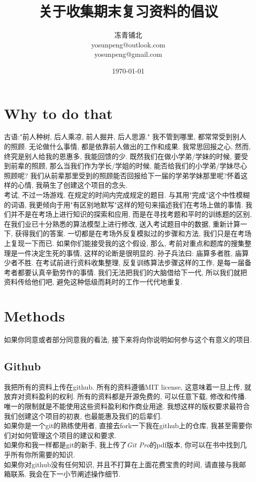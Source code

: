 \documentclass{article}
\title{关于收集期末复习资料的倡议}
\author{冻青铺北\\ yosunpeng@outlook.com \\ yosunpeng@gmail.com}
\date{ \today}
\begin{document}
\begin{spacing}{1.5}

\maketitle
\section{Why to do that}
古语:"前人种树, 后人乘凉, 前人掘井, 后人思源." 我不管到哪里, 都常常受到别人的照顾. 无论做什么事情, 都是依靠前人做出的工作和成果. 我常思回报之心, 然而, 终究是别人给我的恩惠多, 我能回馈的少. 既然我们在做小学弟/学妹的时候, 要受到前辈的照顾, 那么当我们作为学长/学姐的时候, 能否给我们的小学弟/学妹尽心照顾呢? 我们从前辈那里受到的照顾能否回报给下一届的学弟学妹那里呢?怀着这样的心情, 我萌生了创建这个项目的念头. \\
考试, 不过一场游戏. 在规定的时间内完成规定的题目. 与其用"完成"这个中性模糊的词语, 我更倾向于用"有区别地默写"这样的短句来描述我们在考场上做的事情. 我们并不是在考场上进行知识的探索和应用, 而是在寻找考题和平时的训练题的区别, 在我们业已十分熟悉的算法模型上进行修改, 送入考试题目中的数据, 重新计算一下, 获得我们的答案. 一切都是在考场外反复模拟过的步骤和方法, 我们只是在考场上复现一下而已. 如果你们能接受我的这个假设, 那么, 考前对重点和题库的搜集整理是一件决定生死的事情, 这样的论断是很明显的. 孙子兵法曰: 庙算多者胜, 庙算少者不胜. 在考试前进行资料收集整理, 反复训练算法步骤这样的工作, 是每一届备考者都要认真辛勤劳作的事情. 我们无法把我们的大脑借给下一代, 所以我们就把资料传给他们吧, 避免这种低级而耗时的工作一代代地重复.\\
\section{Methods}
如果你同意或者部分同意我的看法, 接下来将向你说明如何参与这个有意义的项目.
\subsection{Github}
我把所有的资料上传在github. 所有的资料遵循MIT license, 这意味着一旦上传, 就放弃对资料盈利的权利. 所有的资料都是开源免费的, 可以任意下载, 修改和传播. 唯一的限制就是不能使用这些资料盈利和作商业用途. 我想这样的版权要求最符合我们创建这个项目的初衷, 也最能惠及我们的后辈们.\\
如果你是一个git的熟练使用者, 直接去fork一下我在github上的仓库, 我甚至需要你们对如何管理这个项目的建议和要求.\\
如果你和我一样都是git的新手, 我上传了\textit{Git Pro}的pdf版本, 你可以在书中找到几乎所有你所需要的知识.\\
如果你对github没有任何知识, 并且不打算在上面花费宝贵的时间, 请直接与我邮箱联系. 我会在下一小节阐述操作细节.

\end{spacing}
\end{document}
